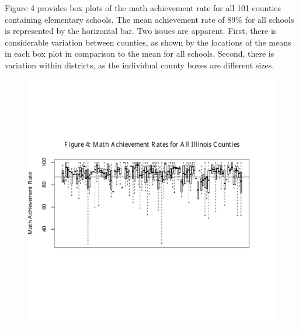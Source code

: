 \documentclass[11pt]{article}
\begin{document}
Figure 4 provides box plots of the math achievement rate for all 101 counties containing elementary schools.  The mean achievement rate of 89\% for all schools is represented by the horizontal bar.  Two issues are apparent.  First, there is considerable variation between counties, as shown by the locations of the means in each box plot in comparison to the mean for all schools.  Second, there is variation within districts, as the individual county boxes are different sizes.

\begin{figure}[H]
\centering
    \includegraphics[trim= 0in 2in 0in 1.75in,clip,scale=0.8]{counties}
\end{figure}
\end{document}
